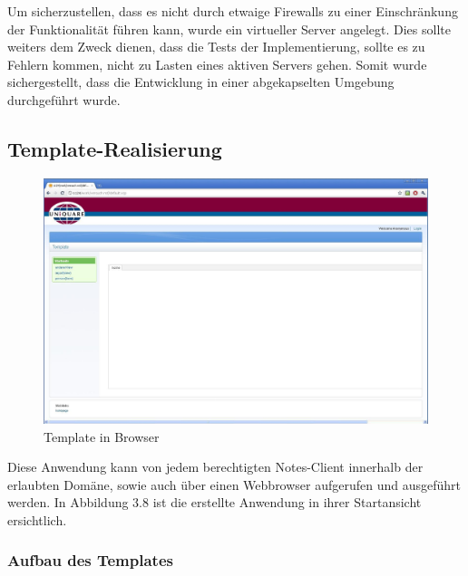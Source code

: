 Um sicherzustellen, dass es nicht durch etwaige Firewalls zu einer Einschränkung der \linebreak Funktionalität führen kann, wurde ein virtueller Server angelegt.
Dies sollte weiters dem Zweck dienen, dass die Tests der Implementierung, sollte es zu Fehlern kommen, nicht zu Lasten eines aktiven Servers gehen.
Somit wurde sichergestellt, dass die Entwicklung in einer abgekapselten Umgebung durchgeführt wurde.

\subsection{Template-Realisierung}
\label{sec:6template}


\begin{figure}[H]
    \centerline{\includegraphics[scale=0.3]{pics/template_chrome}}
    \caption[Template in Browser]{\label{FiG:Template in Browser }
	Template in Browser}
\end{figure} 


Diese Anwendung kann von jedem berechtigten Notes-Client
innerhalb der erlaubten \linebreak Domäne, sowie auch über einen Webbrowser aufgerufen und ausgeführt werden. In Abbildung 3.8 ist die erstellte Anwendung 
in ihrer Startansicht ersichtlich.\newline 

\subsubsection{Aufbau des Templates}
\label{sec:6template}

